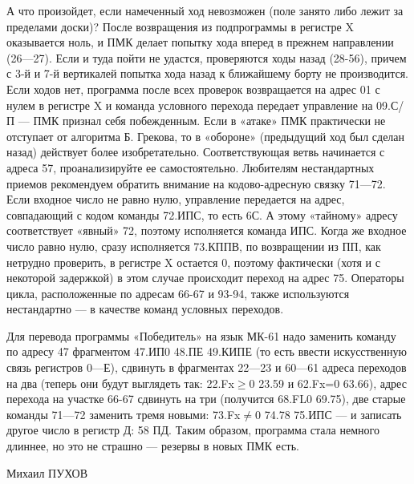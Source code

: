\documentclass[11pt,a4paper,oneside]{article}
\begin{document}
А что произойдет, если намеченный ход невозможен (поле занято либо лежит за пределами доски)? После возвращения из подпрограммы в регистре X оказывается ноль, и ПМК делает попытку хода вперед в прежнем направлении (26—27). Если и туда пойти не удастся, проверяются ходы назад (28-56), причем с 3-й и 7-й вертикалей попытка хода назад к ближайшему борту не производится. Если ходов нет, программа после всех проверок возвращается на адрес 01 с нулем в регистре X и команда условного перехода передает управление на 09.С/П — ПМК признал себя побежденным.
Если в «атаке» ПМК практически не отступает от алгоритма Б. Грекова, то в «обороне» (предыдущий ход был сделан назад) действует более изобретательно. Соответствующая ветвь начинается с адреса 57, проанализируйте ее самостоятельно. Любителям нестандартных приемов рекомендуем обратить внимание на кодово-адресную связку 71—72. Если входное число не равно нулю, управление передается на адрес, совпадающий с кодом команды 72.ИПС, то есть 6С. А этому «тайному» адресу соответствует «явный» 72, поэтому исполняется команда ИПС. Когда же входное число равно нулю, сразу исполняется 73.КППВ, по возвращении из ПП, как нетрудно проверить, в регистре X остается 0, поэтому фактически (хотя и с некоторой задержкой) в этом случае происходит переход на адрес 75. Операторы цикла, расположенные по адресам 66-67 и 93-94, также используются нестандартно — в качестве команд условных переходов.

Для перевода программы «Победитель» на язык МК-61 надо заменить команду по адресу 47 фрагментом 47.ИП0 48.ПЕ 49.КИПЕ (то есть ввести искусственную связь регистров 0—Е), сдвинуть в фрагментах 22—23 и 60—61 адреса переходов на два (теперь они будут выглядеть так: 22.Fx$\geq$0 23.59 и 62.Fx=0 63.66), адрес перехода на участке 66-67 сдвинуть на три (получится 68.FL0 69.75), две старые команды 71—72 заменить тремя новыми: 73.Fx$\neq$0 74.78 75.ИПС — и записать другое число в регистр Д: 58 ПД. Таким образом, программа стала немного длиннее, но это не страшно — резервы в новых ПМК есть.

Михаил ПУХОВ
\end{document}
